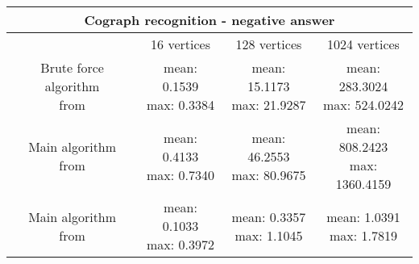 \begin{center}

    \begin{tabular}{ |c|c|c|c|}
        \hline
        \multicolumn{4}{|c|}{Cograph recognition - negative answer} \\
        \hline
         & 16 vertices & 128 vertices & 1024 vertices               \\
        \hline
        \makecell{Brute force algorithm                             \\ from \cite{habib}} & \makecell{mean: 0.1539                                \\ max: 0.3384} & \makecell{mean: 15.1173 \\ max: 21.9287} & \makecell{mean: 283.3024 \\ max: 524.0242} \\
        \hline
        \makecell{Main algorithm                                    \\ from \cite{habib}} & \makecell{mean: 0.4133                                 \\ max: 0.7340} & \makecell{mean: 46.2553 \\ max: 80.9675} & \makecell{mean: 808.2423 \\ max: 1360.4159} \\
        \hline
        \makecell{Main algorithm                                    \\ from \cite{corneil}} & \makecell{mean:  0.1033                                 \\ max: 0.3972} & \makecell{mean: 0.3357  \\ max: 1.1045} & \makecell{mean:  1.0391  \\ max: 1.7819} \\
        \hline
    \end{tabular}
\end{center}
